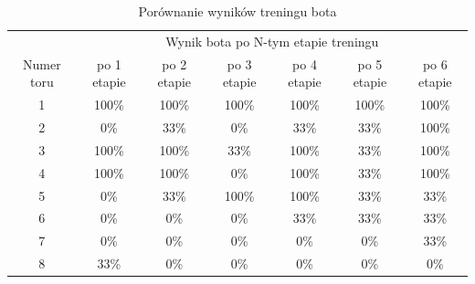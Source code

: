 \begin{table}[H]
    \centering
    \begin{tabular}{|c|c|c|c|c|c|c|}
        \hline
        & \multicolumn{6}{c|}{Wynik bota po N-tym etapie treningu}\\
        Numer toru & po 1 etapie & po 2 etapie & po 3 etapie & po 4 etapie & po 5 etapie & po 6 etapie \\
        \hline
        \hline
        1 & 100\% & 100\% & 100\% & 100\% & 100\% & 100\% \\
        2 & 0\% & 33\% & 0\% & 33\% & 33\% & 100\% \\
        3 & 100\% & 100\% & 33\% & 100\% & 33\% & 100\% \\
        4 & 100\% & 100\% & 0\% & 100\% & 33\% & 100\% \\
        5 & 0\% & 33\% & 100\% & 100\% & 33\% & 33\% \\
        6 & 0\% & 0\% & 0\% & 33\% & 33\% & 33\% \\
        7 & 0\% & 0\% & 0\% & 0\% & 0\% & 33\% \\
        8 & 33\% & 0\% & 0\% & 0\% & 0\% & 0\% \\
        \hline
    \end{tabular}
    \caption{Porównanie wyników treningu bota}
    \label{table}
\end{table}

